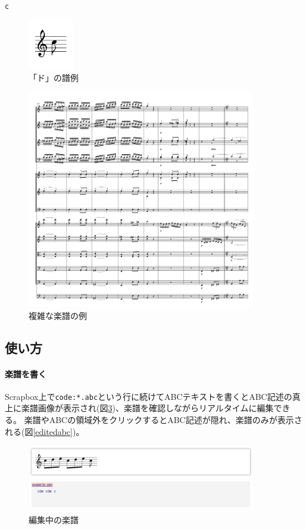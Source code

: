 \begin{lstlisting}[caption=「ド」を表すABC, label=abctext]
    c
\end{lstlisting}
\begin{figure}[H]
\centering
\includegraphics[width=2cm]{images/c.png}
\caption{「ド」の譜例}
\label{abcnote}
\end{figure}

\begin{figure}[H]
\centering
\includegraphics[width=10cm]{images/complexabc.png}
\caption{複雑な楽譜の例}
\label{complex}
\end{figure}


\subsection{使い方}
\paragraph*{楽譜を書く}
Scrapbox上で\texttt{code:*.abc}という行に続けてABCテキストを書くとABC記述の真上に楽譜画像が表示され(図\ref{editingabc})、楽譜を確認しながらリアルタイムに編集できる。
楽譜やABCの領域外をクリックするとABC記述が隠れ、楽譜のみが表示される(図\ref{editedabc})。

\begin{figure}[H]
\centering
\includegraphics[width=10cm]{images/editingabc.png}
\caption{編集中の楽譜}
\label{editingabc}
\end{figure}

